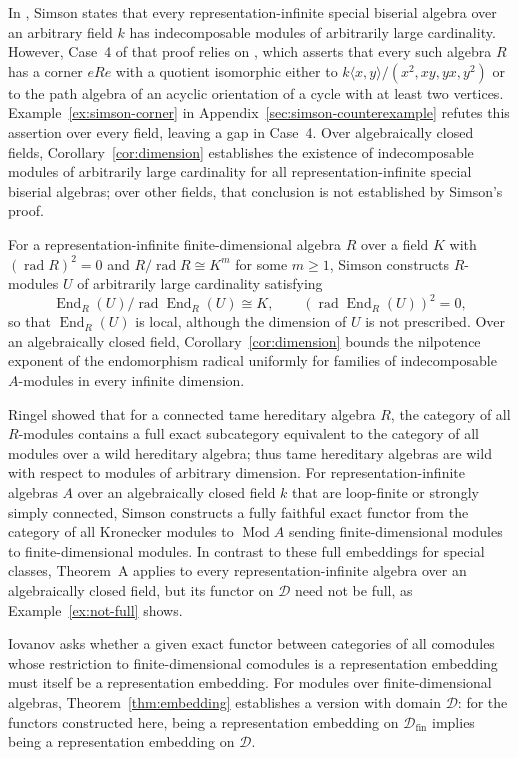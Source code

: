 \documentclass[a4paper,reqno,10pt]{amsart}
\theoremstyle{definition}
\DeclareMathOperator{\End}{End}
\DeclareMathOperator{\rad}{rad}
\DeclareMathOperator{\Mod}{Mod}
\newcommand{\D}{\mathcal D}
\numberwithin{equation}{section}
\begin{document}
In \cite[Theorem~3.1]{SimsonCorner}, Simson states that every
representation-infinite special biserial algebra over an arbitrary field $k$
has indecomposable modules of arbitrarily large cardinality.
However, Case~4 of that proof relies on \cite[Proposition~3.7]{SimsonCorner}, which asserts that
every such algebra $R$ has a corner $eRe$ with a quotient
isomorphic either to $k\langle x,y\rangle/(x^2,xy,yx,y^2)$ or to the
path algebra of an acyclic orientation of a cycle with at least two vertices.
Example~\ref{ex:simson-corner} in Appendix~\ref{sec:simson-counterexample}
refutes this assertion over every field, leaving a gap in Case~4.
Over algebraically closed fields, Corollary~\ref{cor:dimension} establishes
the existence of indecomposable modules of arbitrarily large cardinality for all representation-infinite special biserial algebras; over other fields, that conclusion
is not established by Simson's proof.

For a representation-infinite finite-dimensional algebra $R$ over a
field $K$ with $(\rad R)^2=0$ and $R/\rad R\cong K^m$ for some $m\ge1$,
Simson \cite[Corollary~3.6]{SimsonCorner} constructs $R$-modules $U$ of arbitrarily large cardinality satisfying
\[
 \End_R(U)/\rad\End_R(U)\cong K,\qquad
 (\rad\End_R(U))^2=0,
\]
so that $\End_R(U)$ is local, although the dimension of $U$ is not
prescribed.
Over an algebraically closed field, Corollary~\ref{cor:dimension} bounds the nilpotence exponent of the endomorphism radical uniformly
for families of indecomposable $A$-modules in every infinite dimension.

Ringel \cite[Corollary on p.~407]{RingelInfinite} showed that for a
connected tame hereditary algebra $R$, the category of all $R$-modules
contains a full exact subcategory equivalent to the category of all
modules over a wild hereditary algebra; thus tame hereditary
algebras are wild with respect to modules of arbitrary dimension. For
representation-infinite algebras $A$ over an algebraically closed field
$k$ that are loop-finite or
strongly simply connected, Simson \cite[Theorem~1.2]{SimsonRealization}
constructs a fully faithful exact functor from the category of all
Kronecker modules to $\Mod A$ sending finite-dimensional modules to
finite-dimensional modules. In contrast to these full embeddings for
special classes, Theorem~A applies to every representation-infinite algebra
over an algebraically closed field, but its functor on $\D$ need not be full,
as Example~\ref{ex:not-full} shows.

Iovanov \cite[\S6.1]{Iovanov} asks whether a given exact functor between
categories of all comodules whose restriction to finite-dimensional
comodules is a representation embedding must itself be a representation
embedding. For modules over finite-dimensional algebras,
Theorem~\ref{thm:embedding} establishes a version with domain $\D$:
for the functors constructed here, being a representation embedding on
$\D_{\mathrm{fin}}$ implies being a representation embedding on $\D$.
\end{document}

